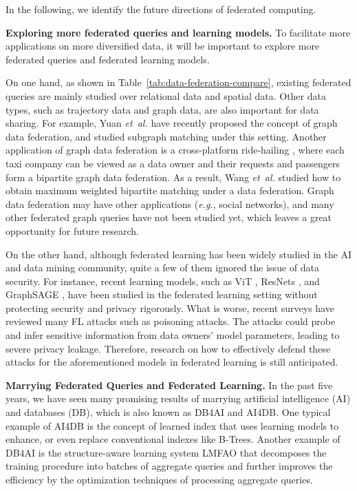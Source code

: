 \documentclass[11pt]{article}
\newcommand{\etal}{\textit{et~al.}\xspace}
\newcommand{\eg}{\textit{e.g.},\xspace}
\newcommand\tabref[1]{Table~\ref{#1}}
\newcommand{\fakeparagraph}[1]{\vspace{1mm}\noindent\textbf{#1.}}
\begin{document}
In the following, we identify the future directions of federated computing.

\fakeparagraph{Exploring more federated queries and learning models}
To facilitate more applications on more diversified data, it will be important to explore more federated queries and federated learning models.

On one hand, as shown in \tabref{tab:data-federation-compare}, existing federated queries are mainly studied over relational data and spatial data.
Other data types, such as trajectory data and graph data, are also important for data sharing.
For example, Yuan \etal \cite{Yongxin-DBLP:journals/pvldb/YuanMWZW21} have recently proposed the concept of graph data federation, and studied subgraph matching under this setting.
Another application of graph data federation is a cross-platform ride-hailing \cite{Yongxin-DBLP:conf/kdd/WangTZRXWL22}, where each taxi company can be viewed as a data owner and their requests and passengers form a bipartite graph data federation.
As a result, Wang \etal \cite{Yongxin-DBLP:conf/kdd/WangTZRXWL22} studied how to obtain maximum weighted bipartite matching under a data federation.
Graph data federation may have other applications (\eg social networks), and many other federated graph queries have not been studied yet, which leaves a great opportunity for future research.

On the other hand, although federated learning has been widely studied in the AI and data mining community, quite a few of them ignored the issue of data security.
For instance, recent learning models, such as ViT \cite{Yongxin-DBLP:conf/iclr/DosovitskiyB0WZ21}, ResNets \cite{Yongxin-DBLP:conf/cvpr/HeZRS16}, and GraphSAGE \cite{Yongxin-DBLP:conf/nips/HamiltonYL17}, have been studied in the federated learning setting without protecting security and privacy rigorously.
What is worse, recent surveys \cite{Yongxin-DBLP:journals/csur/YinZH21} have reviewed many FL attacks such as poisoning attacks. The attacks could probe and infer sensitive information from data owners' model parameters, leading to severe privacy leakage.
Therefore, research on how to effectively defend these attacks for the aforementioned models in federated learning is still anticipated.

\fakeparagraph{Marrying Federated Queries and Federated Learning}
In the past five years, we have seen many promising results of marrying artificial intelligence (AI) and databases (DB), which is also known as DB4AI and AI4DB. One typical example of AI4DB is the concept of learned index \cite{Yongxin-DBLP:conf/sigmod/KraskaBCDP18} that uses learning models to enhance, or even replace conventional indexes like B-Trees. Another example of DB4AI is the structure-aware learning system \textsf{LMFAO} \cite{Yongxin-DBLP:journals/pvldb/Olteanu20} that decomposes the training procedure into batches of aggregate queries and further improves the efficiency by the optimization techniques of processing aggregate queries.
\end{document}
